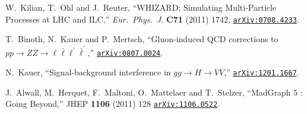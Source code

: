 \documentclass[english,12pt]{article}
\begin{document}
\begin{thebibliography}{10}
  W.~Kilian, T.~Ohl and J.~Reuter,
  ``WHIZARD: Simulating Multi-Particle Processes at LHC and ILC,''
  {\em Eur.\ Phys.\ J.} {\bf C71} (2011) 1742,
 \href{http://arxiv.org/abs/0708.4233}{{\tt arXiv:0708.4233}}.

  T.~Binoth, N.~Kauer and P.~Mertsch,
  ``Gluon-induced QCD corrections to $pp \rightarrow ZZ \rightarrow \ell \bar{\ell} \ell^{'} \bar{\ell}^{'}$,''
  \href{http://arXiv.org/abs/0807.0024}{{\tt arXiv:0807.0024}}.
  
  N.~Kauer,
  ``Signal-background interference in $gg \rightarrow H \rightarrow VV$,''
  \href{http://arXiv.org/abs/1201.1667} {{\tt arXiv:1201.1667}}.

  J.~Alwall, M.~Herquet, F.~Maltoni, O.~Mattelaer and T.~Stelzer,
  ``MadGraph 5 : Going Beyond,''
  JHEP {\bf 1106} (2011) 128
  \href{http://arXiv.org/abs/1106.0522}{\tt arXiv:1106.0522}.

\end{thebibliography}\endgroup
\end{document}
